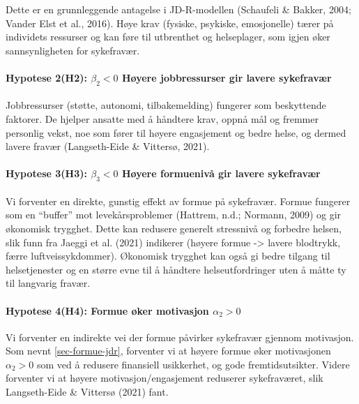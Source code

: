 \documentclass[
  12pt,
  a4paper,
  DIV=11,
  numbers=noendperiod]{scrartcl}
\let\oldparagraph\paragraph
\renewcommand{\paragraph}[1]{\oldparagraph{#1}\mbox{}}
\begin{document}
Dette er en grunnleggende antagelse i JD-R-modellen (Schaufeli \&
Bakker, 2004; Vander Elst et al., 2016). Høye krav (fysiske, psykiske,
emosjonelle) tærer på individets ressurser og kan føre til utbrenthet og
helseplager, som igjen øker sannsynligheten for sykefravær.

\paragraph{\texorpdfstring{Hypotese 2(H2): \(\beta_2 < 0\) Høyere
jobbressurser gir lavere
sykefravær}{Hypotese 2(H2): \textbackslash beta\_2 \textless{} 0 Høyere jobbressurser gir lavere sykefravær}}\label{hypotese-2h2-beta_2-0-huxf8yere-jobbressurser-gir-lavere-sykefravuxe6r}

Jobbressurser (støtte, autonomi, tilbakemelding) fungerer som
beskyttende faktorer. De hjelper ansatte med å håndtere krav, oppnå mål
og fremmer personlig vekst, noe som fører til høyere engasjement og
bedre helse, og dermed lavere fravær (Langseth-Eide \& Vittersø, 2021).

\paragraph{\texorpdfstring{Hypotese 3(H3): \(\beta_3 < 0\) Høyere
formuenivå gir lavere
sykefravær}{Hypotese 3(H3): \textbackslash beta\_3 \textless{} 0 Høyere formuenivå gir lavere sykefravær}}\label{hypotese-3h3-beta_3-0-huxf8yere-formuenivuxe5-gir-lavere-sykefravuxe6r}

Vi forventer en direkte, gunstig effekt av formue på sykefravær. Formue
fungerer som en ``buffer'' mot levekårsproblemer (Hattrem, n.d.;
Normann, 2009) og gir økonomisk trygghet. Dette kan redusere generelt
stressnivå og forbedre helsen, slik funn fra Jaeggi et al. (2021)
indikerer (høyere formue -\textgreater{} lavere blodtrykk, færre
luftveissykdommer). Økonomisk trygghet kan også gi bedre tilgang til
helsetjenester og en større evne til å håndtere helseutfordringer uten å
måtte ty til langvarig fravær.

\paragraph{\texorpdfstring{Hypotese 4(H4): Formue øker motivasjon
\(\alpha_2 > 0\)}{Hypotese 4(H4): Formue øker motivasjon \textbackslash alpha\_2 \textgreater{} 0}}\label{hypotese-4h4-formue-uxf8ker-motivasjon-alpha_2-0}

Vi forventer en indirekte vei der formue påvirker sykefravær gjennom
motivasjon. Som nevnt \autoref{sec-formue-jdr}, forventer vi at høyere
formue øker motivasjonen \(\alpha_2 > 0\) som ved å redusere finansiell
usikkerhet, og gode fremtidsutsikter. Videre forventer vi at høyere
motivasjon/engasjement reduserer sykefraværet, slik Langseth-Eide \&
Vittersø (2021) fant.
\end{document}
